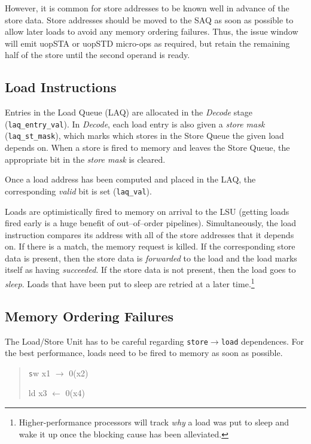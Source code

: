 However, it is common for store addresses to be known well in advance of the store data.  Store addresses should be moved to the SAQ as soon as possible to allow later loads to avoid any memory ordering failures. Thus, the issue window will emit uopSTA or uopSTD micro-ops as required, but retain the remaining half of the store until the second operand is ready.

\subsection{Load Instructions}

Entries in the Load Queue (LAQ) are allocated in the {\em Decode} stage ({\tt laq\_entry\_val}).  In {\em Decode}, each load entry is also given a {\em store mask} ({\tt laq\_st\_mask}), which marks which stores in the Store Queue the given load depends on.  When a store is fired to memory and leaves the Store Queue, the appropriate bit in the {\em store mask} is cleared.

Once a load address has been computed and placed in the LAQ, the corresponding {\em valid} bit is set ({\tt laq\_val}). 

Loads are optimistically fired to memory on arrival to the LSU (getting loads fired early is a huge benefit of out--of--order pipelines).  Simultaneously, the load instruction compares its address with all of the store addresses that it depends on.  If there is a match, the memory request is killed.  If the corresponding store data is present, then the store data is {\em forwarded} to the load and the load marks itself as having {\em succeeded}.  If the store data is not present, then the load goes to {\em sleep}.  Loads that have been put to sleep are retried at a later time.\footnote{Higher-performance processors will track {\em why} a load was put to sleep and wake it up once the blocking cause has been alleviated.}


\subsection{Memory Ordering Failures}

The Load/Store Unit has to be careful regarding {\tt store$\rightarrow$load} dependences.  For the best performance, loads need to be fired to memory as soon as possible. 

\begin{quote}

{\texttt
sw x1 $\rightarrow$ 0(x2)

ld x3 $\leftarrow$ 0(x4)
}

\end{quote}


